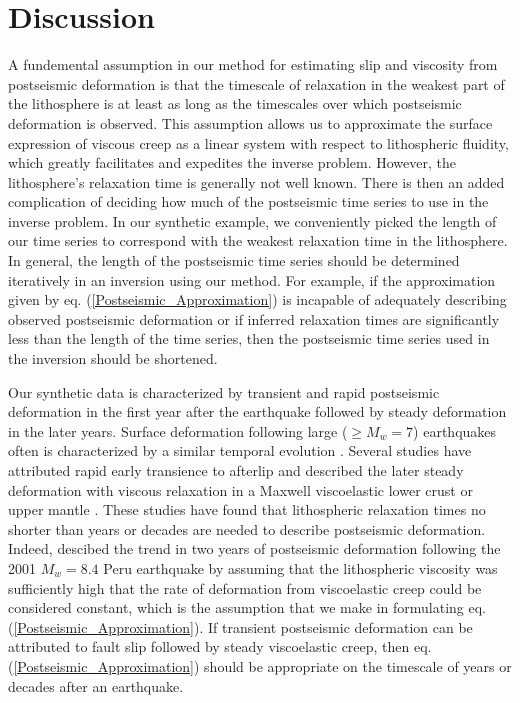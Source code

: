 \documentclass[extra,mreferee]{gji}
\begin{document}
\section{Discussion}

A fundemental assumption in our method for estimating slip and
viscosity from postseismic deformation is that the timescale of
relaxation in the weakest part of the lithosphere is at least as long
as the timescales over which postseismic deformation is observed.
This assumption allows us to approximate the surface expression of
viscous creep as a linear system with respect to lithospheric
fluidity, which greatly facilitates and expedites the inverse problem.
However, the lithosphere's relaxation time is generally not well
known.  There is then an added complication of deciding how much of
the postseismic time series to use in the inverse problem.  In our
synthetic example, we conveniently picked the length of our time
series to correspond with the weakest relaxation time in the
lithosphere. In general, the length of the postseismic time series
should be determined iteratively in an inversion using our method.
For example, if the approximation given by
eq. (\ref{Postseismic_Approximation}) is incapable of adequately
describing observed postseismic deformation or if inferred relaxation
times are significantly less than the length of the time series, then
the postseismic time series used in the inversion should be shortened.

Our synthetic data is characterized by transient and rapid postseismic
deformation in the first year after the earthquake followed by steady
deformation in the later years.  Surface deformation following large
($\geq M_w=7$) earthquakes often is characterized by a similar
temporal evolution \citep[e.g.][]{SS1997,S2005,E2009}.  Several
studies have attributed rapid early transience to afterlip and
described the later steady deformation with viscous relaxation in a
Maxwell viscoelastic lower crust or upper mantle
\citep[e.g.][]{PA2005,J2009,H2009,F2006,R2015}.  These studies have
found that lithospheric relaxation times no shorter than years or
decades are needed to describe postseismic deformation.  Indeed,
\citet{PA2005} descibed the trend in two years of postseismic
deformation following the 2001 $M_w=8.4$ Peru earthquake by assuming
that the lithospheric viscosity was sufficiently high that the rate of
deformation from viscoelastic creep could be considered constant,
which is the assumption that we make in formulating
eq. (\ref{Postseismic_Approximation}). If transient postseismic
deformation can be attributed to fault slip followed by steady
viscoelastic creep, then eq. (\ref{Postseismic_Approximation}) should
be appropriate on the timescale of years or decades after an
earthquake.
\end{document}
